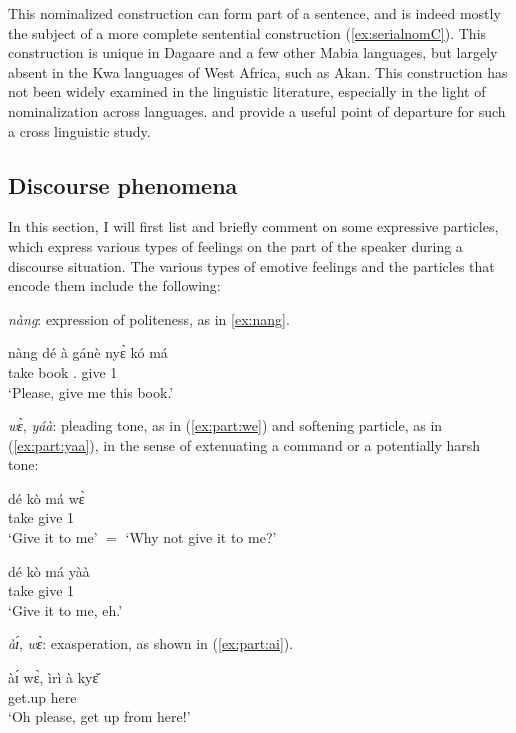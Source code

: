 This nominalized construction can form part of a sentence, and is indeed mostly the subject of
a more complete sentential construction (\ref{ex:serialnomC}). This construction is  unique in Dagaare
and a few other Mabia languages, but largely absent in the Kwa languages of West Africa, such
as Akan. This construction has not been widely examined in the linguistic literature, especially in the light of nominalization across languages. %
\citet{Bodomo1997, Bodomo1997Pathfinders} and \citet{Bodomo2004complex} provide a useful point of departure for such a cross linguistic
study.

\subsection{ Discourse phenomena}
In this section, I will first list and briefly comment on some expressive particles, which 
express various types of feelings on the part of the speaker during a discourse situation. The
various types of emotive feelings and the particles that encode them include the following:\bigskip



\noindent \textit{nàng}: expression of politeness, as in \ref{ex:nang}.

\ea \label{ex:nang}\gll  nàng dé à gánè nyɛ̀ kó má\\
{\PART} take {\DEF} book {\DEM}. give 1{\SG}\\
\glt ‘Please, give me this book.’\z


\noindent \textit{wɛ̀}, \textit{yáà}: pleading tone, as in (\ref{ex:part:we}) and softening particle, as in (\ref{ex:part:yaa}), in the sense of
extenuating a command or a potentially harsh tone:

\ea \label{ex:part:we}\gll  dé kò má wɛ̀\\
take give 1{\SG} {\PART}\\
\glt ‘Give it to me' $=$ `Why not give it to me?’\z

\ea  \label{ex:part:yaa} \gll  dé kò má yàà\\
take give 1{\SG} {\PART}\\
\glt ‘Give it to me, eh.’\z 


\noindent  \textit{àɪ́}, \textit{wɛ̀}: exasperation, as shown in (\ref{ex:part:ai}).


\ea \label{ex:part:ai} \gll  àɪ́ wɛ̀, ìrì à kyɛ̌\\
{\PART} {\PART} get.up {\DEF} here\\
\glt ‘Oh please, get up from here!’\z 

